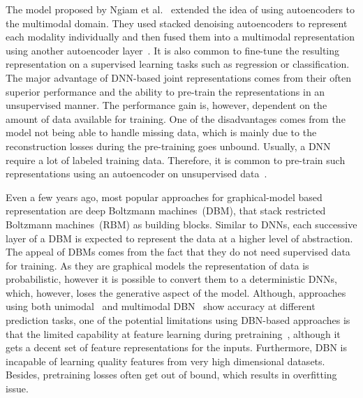 \hspace*{3.5mm} The model proposed by Ngiam et al.~\cite{NgiamKKNLN11} extended the idea of using autoencoders to the multimodal domain. They used stacked denoising autoencoders to represent each modality individually and then fused them into a multimodal representation using another autoencoder layer~\cite{mmsurvey,serban2016multi}. It is also common to fine-tune the resulting representation on a supervised learning tasks such as regression or classification. The major advantage of DNN-based joint representations comes from their often superior performance and the ability to pre-train the representations in an unsupervised manner. The performance gain is, however, dependent on the amount of data available for training. One of the disadvantages comes from the model not being able to handle missing data, which is mainly due to the reconstruction losses during the pre-training goes unbound. Usually, a DNN require a lot of labeled training data. Therefore, it is common to pre-train such representations using an autoencoder on unsupervised data~\cite{mmsurvey}. 

\hspace*{3.5mm} Even a few years ago, most popular approaches for graphical-model based representation are deep Boltzmann machines~(DBM), that stack restricted Boltzmann machines~(RBM) as building blocks. Similar to DNNs, each successive layer of a DBM is expected to represent the data at a higher level of abstraction. The appeal of DBMs comes from the fact that they do not need supervised data for training. As they are graphical models the representation of data is probabilistic, however it is possible to convert them to a deterministic DNNs, which, however, loses the generative aspect of the model. Although, approaches using both unimodal~\cite{abdel2016breast} and multimodal DBN~\cite{liang} show accuracy at different prediction tasks, one of the potential limitations using DBN-based approaches is that the limited capability at feature learning during pretraining~\cite{serban2016multi}, although it gets a decent set of feature representations for the inputs. Furthermore, DBN is incapable of learning quality features from very high dimensional datasets. Besides, pretraining losses often get out of bound, which results in overfitting issue. 

